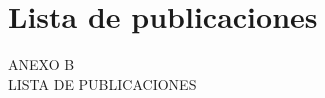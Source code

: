 
{
\Hide
\chapter{Lista de publicaciones}
}

\begin{titular} 
	\uppercase{
	Anexo B \\
	Lista de publicaciones \\
	}
\end{titular}

